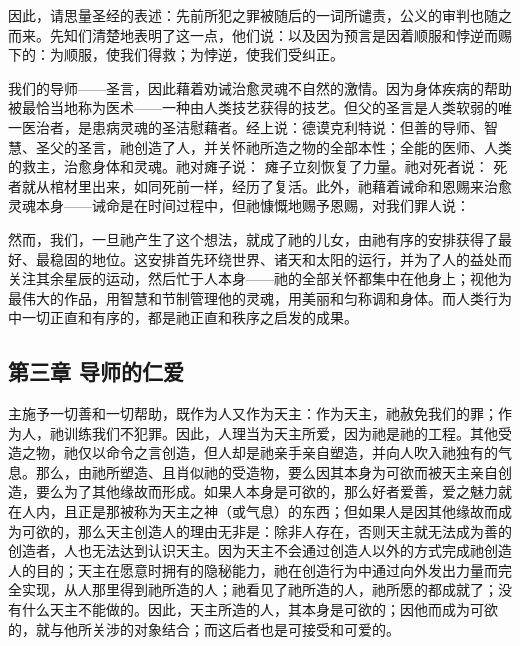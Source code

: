 因此，请思量圣经的表述：先前所犯之罪被随后的一词所谴责，公义的审判也随之而来。先知们清楚地表明了这一点，他们说：以及因为预言是因着顺服和悖逆而赐下的：为顺服，使我们得救；为悖逆，使我们受纠正。\par

我们的导师——圣言，因此藉着劝诫治愈灵魂不自然的激情。因为身体疾病的帮助被最恰当地称为医术——一种由人类技艺获得的技艺。但父的圣言是人类软弱的唯一医治者，是患病灵魂的圣洁慰藉者。经上说：德谟克利特说：但善的导师、智慧、圣父的圣言，祂创造了人，并关怀祂所造之物的全部本性；全能的医师、人类的救主，治愈身体和灵魂。祂对瘫子说： 瘫子立刻恢复了力量。祂对死者说： 死者就从棺材里出来，如同死前一样，经历了复活。此外，祂藉着诫命和恩赐来治愈灵魂本身——诫命是在时间过程中，但祂慷慨地赐予恩赐，对我们罪人说：\par

然而，我们，一旦祂产生了这个想法，就成了祂的儿女，由祂有序的安排获得了最好、最稳固的地位。这安排首先环绕世界、诸天和太阳的运行，并为了人的益处而关注其余星辰的运动，然后忙于人本身——祂的全部关怀都集中在他身上；视他为最伟大的作品，用智慧和节制管理他的灵魂，用美丽和匀称调和身体。而人类行为中一切正直和有序的，都是祂正直和秩序之启发的成果。\par


\subsection{第三章 导师的仁爱}

主施予一切善和一切帮助，既作为人又作为天主：作为天主，祂赦免我们的罪；作为人，祂训练我们不犯罪。因此，人理当为天主所爱，因为祂是祂的工程。其他受造之物，祂仅以命令之言创造，但人却是祂亲手亲自塑造，并向人吹入祂独有的气息。那么，由祂所塑造、且肖似祂的受造物，要么因其本身为可欲而被天主亲自创造，要么为了其他缘故而形成。如果人本身是可欲的，那么好者爱善，爱之魅力就在人内，且正是那被称为天主之神（或气息）的东西；但如果人是因其他缘故而成为可欲的，那么天主创造人的理由无非是：除非人存在，否则天主就无法成为善的创造者，人也无法达到认识天主。因为天主不会通过创造人以外的方式完成祂创造人的目的；天主在愿意时拥有的隐秘能力，祂在创造行为中通过向外发出力量而完全实现，从人那里得到祂所造的人；祂看见了祂所造的人，祂所愿的都成就了；没有什么天主不能做的。因此，天主所造的人，其本身是可欲的；因他而成为可欲的，就与他所关涉的对象结合；而这后者也是可接受和可爱的。\par

